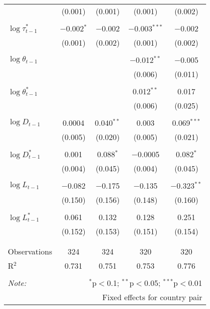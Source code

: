 \begin{tabular}{@{\extracolsep{5pt}}lcccc}
  & (0.001) & (0.001) & (0.001) & (0.002) \\ 
  & & & & \\ 
 $\log \tau_{t-1}^*$ & $-$0.002$^{*}$ & $-$0.002 & $-$0.003$^{***}$ & $-$0.002 \\ 
  & (0.001) & (0.002) & (0.001) & (0.002) \\ 
  & & & & \\ 
 $\log \theta_{t-1}$ &  &  & $-$0.012$^{**}$ & $-$0.005 \\ 
  &  &  & (0.006) & (0.011) \\ 
  & & & & \\ 
 $\log \theta_{t-1}^*$ &  &  & 0.012$^{**}$ & 0.017 \\ 
  &  &  & (0.006) & (0.025) \\ 
  & & & & \\ 
 $\log D_{t-1}$ & 0.0004 & 0.040$^{**}$ & 0.003 & 0.069$^{***}$ \\ 
  & (0.005) & (0.020) & (0.005) & (0.021) \\ 
  & & & & \\ 
 $\log D_{t-1}^*$ & 0.001 & 0.088$^{*}$ & $-$0.0005 & 0.082$^{*}$ \\ 
  & (0.004) & (0.045) & (0.004) & (0.045) \\ 
  & & & & \\ 
 $\log L_{t-1}$ & $-$0.082 & $-$0.175 & $-$0.135 & $-$0.323$^{**}$ \\ 
  & (0.150) & (0.156) & (0.148) & (0.160) \\ 
  & & & & \\ 
 $\log L_{t-1}^*$ & 0.061 & 0.132 & 0.128 & 0.251 \\ 
  & (0.152) & (0.153) & (0.151) & (0.154) \\ 
  & & & & \\ 
\hline \\[-1.8ex] 
Observations & 324 & 324 & 320 & 320 \\ 
R$^{2}$ & 0.731 & 0.751 & 0.753 & 0.776 \\ 
\hline 
\hline \\[-1.8ex] 
\textit{Note:}  & \multicolumn{4}{r}{$^{*}$p$<$0.1; $^{**}$p$<$0.05; $^{***}$p$<$0.01} \\ 
 & \multicolumn{4}{r}{Fixed effects for country pair} \\ 
\end{tabular} 
